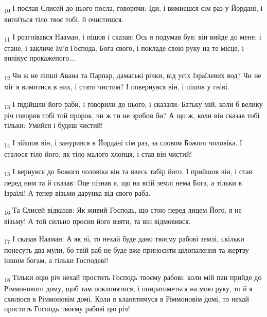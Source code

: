 \begin{tcolorbox}
\textsubscript{10} І послав Єлисей до нього посла, говорячи: Іди, і вимиєшся сім раз у Йордані, і вигоїться тіло твоє тобі, й очистишся.
\end{tcolorbox}
\begin{tcolorbox}
\textsubscript{11} І розгнівався Нааман, і пішов і сказав: Ось я подумав був: він вийде до мене, і стане, і закличе Ім'я Господа, Бога свого, і покладе свою руку на те місце, і вилікує прокаженого...
\end{tcolorbox}
\begin{tcolorbox}
\textsubscript{12} Чи ж не ліпші Авана та Парпар, дамаські річки, від усіх Ізраїлевих вод? Чи не міг я вимитися в них, і стати чистим? І повернувся він, і пішов у гніві.
\end{tcolorbox}
\begin{tcolorbox}
\textsubscript{13} І підійшли його раби, і говорили до нього, і сказали: Батьку мій, коли б велику річ говорив тобі той пророк, чи ж ти не зробив би? А що ж, коли він сказав тобі тільки: Умийся і будеш чистий!
\end{tcolorbox}
\begin{tcolorbox}
\textsubscript{14} І зійшов він, і занурився в Йордані сім раз, за словом Божого чоловіка. І сталося тіло його, як тіло малого хлопця, і став він чистий!
\end{tcolorbox}
\begin{tcolorbox}
\textsubscript{15} І вернувся до Божого чоловіка він та ввесь табір його. І прийшов він, і став перед ним та й сказав: Оце пізнав я, що на всій землі нема Бога, а тільки в Ізраїлі! А тепер візьми дарунка від свого раба.
\end{tcolorbox}
\begin{tcolorbox}
\textsubscript{16} Та Єлисей відказав: Як живий Господь, що стою перед лицем Його, я не візьму! А той сильно просив його взяти, та він відмовився.
\end{tcolorbox}
\begin{tcolorbox}
\textsubscript{17} І сказав Нааман: А як ні, то нехай буде дано твоєму рабові землі, скільки понесуть два мули, бо твій раб не буде вже приносити цілопалення та жертву іншим богам, а тільки Господеві!
\end{tcolorbox}
\begin{tcolorbox}
\textsubscript{18} Тільки оцю річ нехай простить Господь твоєму рабові: коли мій пан прийде до Ріммонового дому, щоб там поклонятися, і опиратиметься на мою руку, то й я схилюся в Ріммоновім домі. Коли я кланятимуся в Ріммоновім домі, то нехай простить Господь твоєму рабові цю річ!
\end{tcolorbox}

